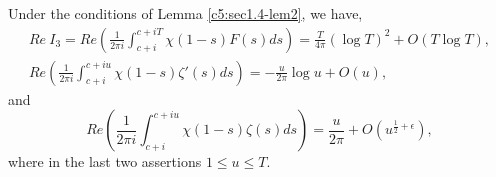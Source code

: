 \begin{lem}\label{c5:sec1.4-lem3}
Under the conditions of Lemma \ref{c5:sec1.4-lem2}, we have,
\begin{gather*}
Re\ I_{3}=Re\left(\frac{1}{2\pi
  i}\int^{c+iT}_{c+i}\chi(1-s)F(s)ds\right)=\frac{T}{4\pi}(\log
T)^{2}+O(T\log T),\tag{5.4.13}\label{c5:eq5.4.13}\\
Re\left(\frac{1}{2\pi
  i}\int^{c+iu}_{c+i}\chi(1-s)\zeta'(s)ds\right)=-\frac{u}{2\pi}\log
u+O(u),\tag{5.4.14}\label{c5:eq5.4.14} 
\end{gather*}
and
\begin{equation*}
Re\left(\frac{1}{2\pi i}\int^{c+iu}_{c+i}\chi(1-s)\zeta(s)ds\right)=\frac{u}{2\pi}+O(u^{\frac{1}{2}+\epsilon}),\tag{5.4.15}\label{c5:eq5.4.15}
\end{equation*}
where in the last two assertions $1\leq u\leq T$.
\end{lem}

